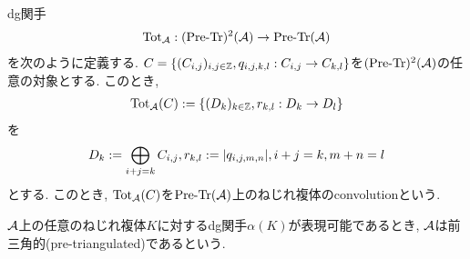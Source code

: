 \documentclass[uplatex, a4paper, 14Q, dvipdfmx]{jsarticle}
\begin{document}
\begin{definition}
  dg関手
  \begin{align*}
    \mathrm{Tot}_{\mathcal{A}} : (\mathrm{Pre} \text{-} \mathrm{Tr})^2(\mathcal{A}) \to \mathrm{Pre} \text{-} \mathrm{Tr}(\mathcal{A})
  \end{align*}
  を次のように定義する. 
  $C=\{(C_{i,j})_{i,j \in \mathbb{Z}}, q_{i,j,k,l} : C_{i,j} \to C_{k,l}\}$を$(\mathrm{Pre} \text{-} \mathrm{Tr})^2(\mathcal{A})$の任意の対象とする.
  このとき, 
  \begin{align*}
    \mathrm{Tot}_{\mathcal{A}}(C) := \{(D_k)_{k \in \mathbb{Z}}, r_{k,l} : D_k \to D_l\}
  \end{align*}
  を
  \begin{align*}
    D_k := \bigoplus_{i+j=k}C_{i,j}, r_{k,l} := \lvert {q_{i,j,m,n}} \rvert, i+j=k, m+n=l
  \end{align*}
  とする.
  このとき, $\mathrm{Tot}_{\mathcal{A}}(C)$を$\mathrm{Pre} \text{-} \mathrm{Tr}(\mathcal{A})$上のねじれ複体のconvolutionという.
\end{definition}



\begin{definition}[前三角的]
  $\mathcal{A}$上の任意のねじれ複体$K$に対するdg関手$\alpha(K)$が表現可能であるとき, $\mathcal{A}$は前三角的(pre-triangulated)であるという. 
\end{definition}
\end{document}

